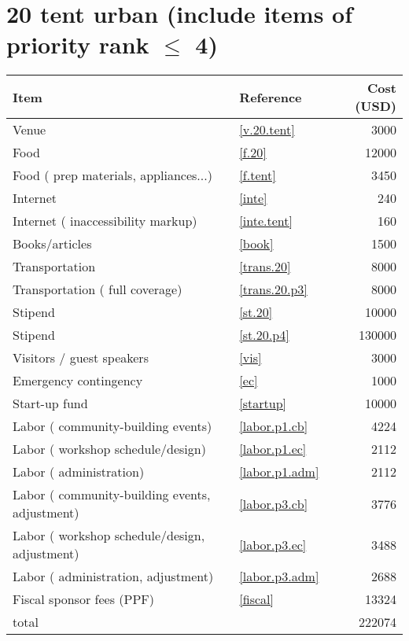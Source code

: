 \section*{20 tent urban (include items of priority rank $\leq$ 4)}
\begin{center}
\begin{tabular}{llr}
Item & Reference & Cost (USD) \\ \hline
Venue & \ref{v.20.tent} & 3000 \\
Food & \ref{f.20} & 12000 \\
Food ( prep materials, appliances...) & \ref{f.tent} & 3450 \\
Internet & \ref{inte} & 240 \\
Internet ( inaccessibility markup) & \ref{inte.tent} & 160 \\
Books/articles & \ref{book} & 1500 \\
Transportation & \ref{trans.20} & 8000 \\
Transportation ( full coverage) & \ref{trans.20.p3} & 8000 \\
Stipend & \ref{st.20} & 10000 \\
Stipend & \ref{st.20.p4} & 130000 \\
Visitors / guest speakers & \ref{vis} & 3000 \\
Emergency contingency & \ref{ec} & 1000 \\
Start-up fund & \ref{startup} & 10000 \\
Labor ( community-building events) & \ref{labor.p1.cb} & 4224 \\
Labor ( workshop schedule/design) & \ref{labor.p1.ec} & 2112 \\
Labor ( administration) & \ref{labor.p1.adm} & 2112 \\
Labor ( community-building events, adjustment) & \ref{labor.p3.cb} & 3776 \\
Labor ( workshop schedule/design, adjustment) & \ref{labor.p3.ec} & 3488 \\
Labor ( administration, adjustment) & \ref{labor.p3.adm} & 2688 \\
Fiscal sponsor fees (PPF) & \ref{fiscal} & 13324 \\ \hline
total &  & 222074
\end{tabular}
\end{center}
\newpage
